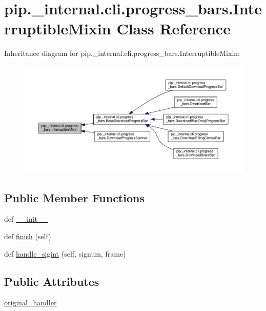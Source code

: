 \hypertarget{classpip_1_1__internal_1_1cli_1_1progress__bars_1_1InterruptibleMixin}{}\section{pip.\+\_\+internal.\+cli.\+progress\+\_\+bars.\+Interruptible\+Mixin Class Reference}
\label{classpip_1_1__internal_1_1cli_1_1progress__bars_1_1InterruptibleMixin}


Inheritance diagram for pip.\+\_\+internal.\+cli.\+progress\+\_\+bars.\+Interruptible\+Mixin\+:
\nopagebreak
\begin{figure}[H]
\begin{center}
\leavevmode
\includegraphics[width=350pt]{classpip_1_1__internal_1_1cli_1_1progress__bars_1_1InterruptibleMixin__inherit__graph}
\end{center}
\end{figure}
\subsection*{Public Member Functions}
\begin{DoxyCompactItemize}
\item 
def \hyperlink{classpip_1_1__internal_1_1cli_1_1progress__bars_1_1InterruptibleMixin_a68e5844e2a3fb4012a74b4f31010564e}{\+\_\+\+\_\+init\+\_\+\+\_\+}
\item 
def \hyperlink{classpip_1_1__internal_1_1cli_1_1progress__bars_1_1InterruptibleMixin_ac1d9459a8b58f1d12b3335e169457771}{finish} (self)
\item 
def \hyperlink{classpip_1_1__internal_1_1cli_1_1progress__bars_1_1InterruptibleMixin_a34e51c4e78987d66d0ec66f03bd60b4d}{handle\+\_\+sigint} (self, signum, frame)
\end{DoxyCompactItemize}
\subsection*{Public Attributes}
\begin{DoxyCompactItemize}
\item 
\hyperlink{classpip_1_1__internal_1_1cli_1_1progress__bars_1_1InterruptibleMixin_aeeeaee21bc85a7548923f3b7b81a24f0}{original\+\_\+handler}
\end{DoxyCompactItemize}


